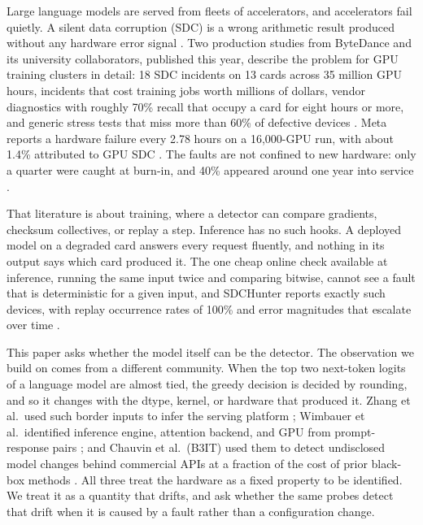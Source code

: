 \documentclass[11pt]{article}
\begin{document}
Large language models are served from fleets of accelerators, and accelerators fail quietly. A silent data corruption (SDC) is a wrong arithmetic result produced without any hardware error signal \citep{dixit2021sdc,hochschild2021cores}. Two production studies from ByteDance and its university collaborators, published this year, describe the problem for GPU training clusters in detail: 18 SDC incidents on 13 cards across 35 million GPU hours, incidents that cost training jobs worth millions of dollars, vendor diagnostics with roughly 70\% recall that occupy a card for eight hours or more, and generic stress tests that miss more than 60\% of defective devices \citep{lei2026aegis,zheng2026sdcwild}. Meta reports a hardware failure every 2.78 hours on a 16{,}000-GPU run, with about 1.4\% attributed to GPU SDC \citep{grattafiori2024llama3,altenbernd2026sdc}. The faults are not confined to new hardware: only a quarter were caught at burn-in, and 40\% appeared around one year into service \citep{zheng2026sdcwild}.

That literature is about training, where a detector can compare gradients, checksum collectives, or replay a step. Inference has no such hooks. A deployed model on a degraded card answers every request fluently, and nothing in its output says which card produced it. The one cheap online check available at inference, running the same input twice and comparing bitwise, cannot see a fault that is deterministic for a given input, and SDCHunter reports exactly such devices, with replay occurrence rates of 100\% and error magnitudes that escalate over time \citep{zheng2026sdcwild}.

This paper asks whether the model itself can be the detector. The observation we build on comes from a different community. When the top two next-token logits of a language model are almost tied, the greedy decision is decided by rounding, and so it changes with the dtype, kernel, or hardware that produced it. Zhang et al.\ used such border inputs to infer the serving platform \citep{zhang2024hspi}; Wimbauer et al.\ identified inference engine, attention backend, and GPU from prompt-response pairs \citep{wimbauer2026fingerprinting}; and Chauvin et al.\ (B3IT) used them to detect undisclosed model changes behind commercial APIs at a fraction of the cost of prior black-box methods \citep{chauvin2026b3it}. All three treat the hardware as a fixed property to be identified. We treat it as a quantity that drifts, and ask whether the same probes detect that drift when it is caused by a fault rather than a configuration change.
\end{document}
